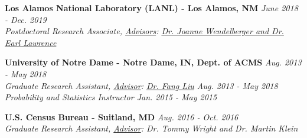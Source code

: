 \workspace
    \textbf{Los Alamos National Laboratory (LANL) - Los Alamos, NM} \hfill \textit{June 2018 - Dec. 2019}\\
    \textit{Postdoctoral Research Associate, \underline{Advisors}: \href{http://www.lanl.gov/expertise/profiles/view/joanne-wendelberger}{Dr. Joanne Wendelberger and Dr. Earl Lawrence}}

\workspace
    \textbf{University of Notre Dame - Notre Dame, IN, Dept. of ACMS} \hfill \textit{Aug. 2013 - May 2018}\\
    \textit{Graduate Research Assistant, \underline{Advisor}: \href{http://acms.nd.edu/people/faculty/fang-liu/}{Dr. Fang Liu} \hfill Aug. 2013 - May 2018}\\
    \textit{Probability and Statistics Instructor \hfill Jan. 2015 - May 2015}

\workspace
    \textbf{U.S. Census Bureau - Suitland, MD} \hfill \textit{Aug. 2016 - Oct. 2016}\\
    \textit{Graduate Research Assistant, \underline{Advisor}: Dr. Tommy Wright and Dr. Martin Klein}
    
